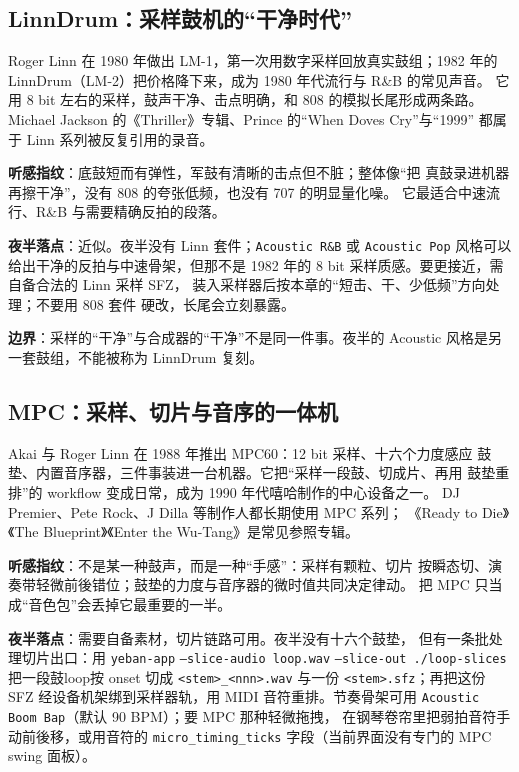 \subsection{LinnDrum：采样鼓机的“干净时代”}
\label{sec:iconic-linn}

Roger Linn 在 1980 年做出 LM-1，第一次用数字采样回放真实鼓组；1982 年的
LinnDrum（LM-2）把价格降下来，成为 1980 年代流行与 R\&B 的常见声音。
它用 8 bit 左右的采样，鼓声干净、击点明确，和 808 的模拟长尾形成两条路。
Michael Jackson 的《Thriller》专辑、Prince 的“When Doves Cry”与“1999”
都属于 Linn 系列被反复引用的录音。

\textbf{听感指纹}：底鼓短而有弹性，军鼓有清晰的击点但不脏；整体像“把
真鼓录进机器再擦干净”，没有 808 的夸张低频，也没有 707 的明显量化噪。
它最适合中速流行、R\&B 与需要精确反拍的段落。

\textbf{夜半落点}：近似。夜半没有 Linn 套件；\texttt{Acoustic R\&B}
或 \texttt{Acoustic Pop} 风格可以给出干净的反拍与中速骨架，但那不是
1982 年的 8 bit 采样质感。要更接近，需自备合法的 Linn 采样 SFZ，
装入采样器后按本章的“短击、干、少低频”方向处理；不要用 808 套件
硬改，长尾会立刻暴露。

\textbf{边界}：采样的“干净”与合成器的“干净”不是同一件事。夜半的
Acoustic 风格是另一套鼓组，不能被称为 LinnDrum 复刻。

\subsection{MPC：采样、切片与音序的一体机}
\label{sec:iconic-mpc}

Akai 与 Roger Linn 在 1988 年推出 MPC60：12 bit 采样、十六个力度感应
鼓垫、内置音序器，三件事装进一台机器。它把“采样一段鼓、切成片、再用
鼓垫重排”的 workflow 变成日常，成为 1990 年代嘻哈制作的中心设备之一。
DJ Premier、Pete Rock、J Dilla 等制作人都长期使用 MPC 系列；
《Ready to Die》《The Blueprint》《Enter the Wu-Tang》是常见参照专辑。

\textbf{听感指纹}：不是某一种鼓声，而是一种“手感”：采样有颗粒、切片
按瞬态切、演奏带轻微前後错位；鼓垫的力度与音序器的微时值共同决定律动。
把 MPC 只当成“音色包”会丢掉它最重要的一半。

\textbf{夜半落点}：需要自备素材，切片链路可用。夜半没有十六个鼓垫，
但有一条批处理切片出口：用 \texttt{yeban-app} \texttt{--slice-audio loop.wav}
\texttt{--slice-out ./loop-slices} 把一段鼓loop按 onset 切成
\texttt{<stem>\_<nnn>.wav} 与一份 \texttt{<stem>.sfz}；再把这份 SFZ
经设备机架绑到采样器轨，用 MIDI 音符重排。节奏骨架可用
\texttt{Acoustic Boom Bap}（默认 90 BPM）；要 MPC 那种轻微拖拽，
在钢琴卷帘里把弱拍音符手动前後移，或用音符的
\texttt{micro\_timing\_ticks} 字段（当前界面没有专门的 MPC swing 面板）。

